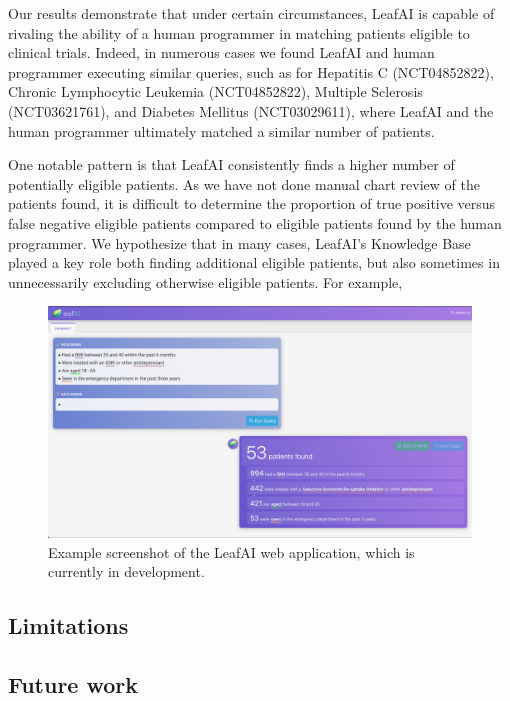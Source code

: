 \documentclass[../main.tex]{subfiles}
\begin{document}
Our results demonstrate that under certain circumstances, LeafAI is capable of rivaling the ability of a human programmer in matching patients eligible to clinical trials. Indeed, in numerous cases we found LeafAI and human programmer executing similar queries, such as for Hepatitis C (NCT04852822), Chronic Lymphocytic Leukemia (NCT04852822), Multiple Sclerosis (NCT03621761), and Diabetes Mellitus (NCT03029611), where LeafAI and the human programmer ultimately matched a similar number of patients.

One notable pattern is that LeafAI consistently finds a higher number of potentially eligible patients. As we have not done manual chart review of the patients found, it is difficult to determine the proportion of true positive versus false negative eligible patients compared to eligible patients found by the human programmer. We hypothesize that in many cases, LeafAI's Knowledge Base played a key role both finding additional eligible patients, but also sometimes in unnecessarily excluding otherwise eligible patients. For example, 


\begin{figure}[p]
  \includegraphics[scale=0.26]{figures/leafai_screenshot.png}  
\caption{Example screenshot of the LeafAI web application, which is currently in development.}
\label{fig_leafai_screenshot}
\end{figure}

\subsection*{Limitations}
\subsection*{Future work}
\end{document}
